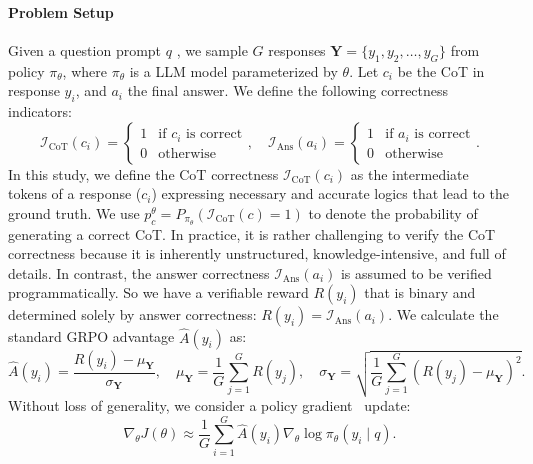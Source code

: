 \paragraph{Problem Setup}
Given a question prompt $q$ , we sample $G$ responses $\mathbf{Y} = \{y_1, y_2, \dots, y_G\}$ from policy $\pi_\theta$, where $\pi_\theta$ is a LLM model parameterized by $\theta$. Let $c_i$ be the CoT in response $y_i$, and $a_i$ the final answer. We define the following correctness indicators: 
\begin{equation}
     \mathcal{I}_{\text{CoT}}(c_i) = \begin{cases} 
1 & \text{if } c_i \text{ is correct} \\ 
0 & \text{otherwise}
     \end{cases},
     \quad
     \mathcal{I}_{\text{Ans}}(a_i) =
     \begin{cases} 
1 & \text{if } a_i \text{ is correct} \\
0 & \text{otherwise}
     \end{cases}.
\end{equation}
In this study, we define the CoT correctness $\mathcal{I}_{\text{CoT}}(c_i)$ as the intermediate tokens of a response ($c_i$) expressing necessary and accurate logics that lead to the ground truth. We use $p_c^\theta = P_{\pi_\theta}(\mathcal{I}_{\text{CoT}}(c)=1)$ to denote the probability of generating a correct CoT.
In practice, it is rather challenging to verify the CoT correctness because it is inherently unstructured, knowledge-intensive, and full of details.
In contrast, the answer correctness $\mathcal{I}_{\text{Ans}}(a_i)$ is assumed to be verified programmatically.
So we have a verifiable reward $R(y_i)$ that is binary and determined solely by answer correctness: $R(y_i) = \mathcal{I}_{\text{Ans}}(a_i)$.
We calculate the standard GRPO advantage $\hat{A}(y_i)$ as:
\begin{equation}
\hat{A}(y_i) = \frac{R(y_i) - \mu_{\mathbf{Y}}}{\sigma_{\mathbf{Y}}}, \quad 
\mu_{\mathbf{Y}} = \frac{1}{G}\sum_{j=1}^G R(y_j), \quad 
\sigma_{\mathbf{Y}} = \sqrt{\frac{1}{G}\sum_{j=1}^G (R(y_j) - \mu_{\mathbf{Y}})^2} .
\label{eq:grpo_advantage}
\end{equation}
Without loss of generality, we consider a policy gradient~\citep{sutton1999PolicyGrad} update:
\begin{equation}
\nabla_\theta J(\theta) \approx \frac{1}{G} \sum_{i=1}^G \hat{A}(y_i) \nabla_\theta \log \pi_\theta(y_i \mid q).
\label{eq:gradient_update}
\end{equation}


